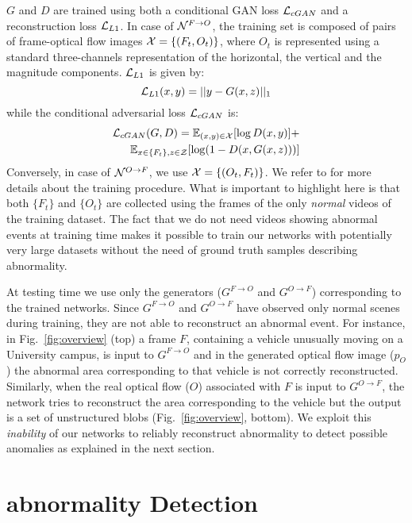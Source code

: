\documentclass{article}
\begin{document}
	
	$G$ and $D$ are trained using both a conditional GAN loss ${\cal L}_{cGAN}$ and a reconstruction loss
	${\cal L}_{L1}$. In case of ${\cal N}^{F \rightarrow O}$, the training set is composed of pairs of frame-optical flow images
	${\cal X} = \{ (F_t, O_t) \}$, where $O_t$ is represented using a standard three-channels representation of the horizontal, the vertical and the magnitude components. 
	${\cal L}_{L1}$ is given by:
	\begin{equation}
	{\cal L}_{L1}(x,y) = ||y - G(x,z) ||_1
	\end{equation}
	\noindent
	while the conditional adversarial loss ${\cal L}_{cGAN}$ is:
\begin{align}
	{\cal L}_{cGAN}(G,D)= 
	\mathbb{E}_{(x,y) \in {\cal X}} [\log D(x,y)] + \\
	\mathbb{E}_{x \in \{ F_t \}, z \in {\cal Z}} [\log ( 1 - D(x,G(x,z)) )]
	\end{align}
	Conversely, in case of ${\cal N}^{O \rightarrow F}$, we use ${\cal X} = \{ (O_t, F_t) \}$. We refer to \cite{DBLP:journals/corr/IsolaZZE16} for more details about the training procedure. 
What is important to highlight here is that both $ \{ F_t \}$ and $\{ O_t \}$ are collected 
	using the frames of the only {\em normal} videos of the training dataset. 
	The fact that we do not need videos showing abnormal events at training time makes it possible to train our networks with potentially very large datasets without the need of ground truth samples describing abnormality.
	
	At testing time we use only the generators ($G^{F \rightarrow O}$ and $G^{O \rightarrow F}$) corresponding to the trained networks.
	Since $G^{F \rightarrow O}$ and $G^{O \rightarrow F}$ have observed 
	only normal scenes during training, they are not able to reconstruct an abnormal event. 
	For instance, in Fig.~\ref{fig:overview} (top) a frame $F$, containing a vehicle unusually moving on a University campus,
	is input to $G^{F \rightarrow O}$ and in the generated optical flow image ($p_O$) the abnormal area corresponding to that vehicle is not correctly reconstructed. Similarly, when the real optical flow ($O$) associated with $F$ is input to $G^{O \rightarrow F}$, the network tries to reconstruct the area corresponding to the vehicle but the output is a set of unstructured blobs (Fig.~\ref{fig:overview}, bottom).
	We exploit this {\em inability} of our networks to reliably reconstruct abnormality to detect possible anomalies as explained in the next section.
	
	
	\section{abnormality Detection}
	\label{sec:Detection}
	
\end{document}

